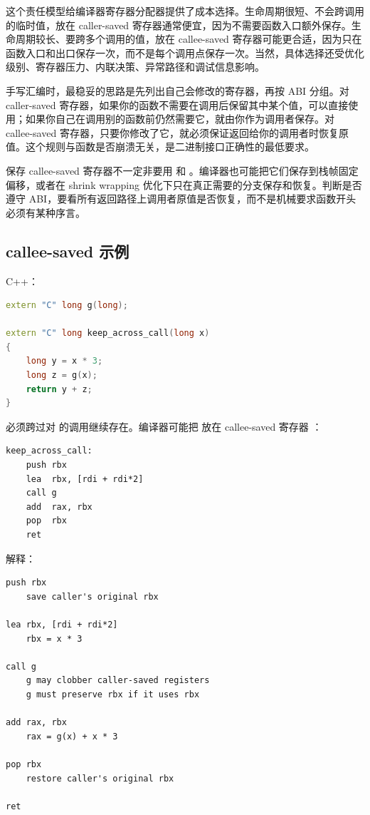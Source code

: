 这个责任模型给编译器寄存器分配器提供了成本选择。生命周期很短、不会跨调用的临时值，放在 caller-saved 寄存器通常便宜，因为不需要函数入口额外保存。生命周期较长、要跨多个调用的值，放在 callee-saved 寄存器可能更合适，因为只在函数入口和出口保存一次，而不是每个调用点保存一次。当然，具体选择还受优化级别、寄存器压力、内联决策、异常路径和调试信息影响。

手写汇编时，最稳妥的思路是先列出自己会修改的寄存器，再按 ABI 分组。对 caller-saved 寄存器，如果你的函数不需要在调用后保留其中某个值，可以直接使用；如果你自己在调用别的函数前仍然需要它，就由你作为调用者保存。对 callee-saved 寄存器，只要你修改了它，就必须保证返回给你的调用者时恢复原值。这个规则与函数是否崩溃无关，是二进制接口正确性的最低要求。

\begin{deepdive}
保存 callee-saved 寄存器不一定非要用  和 。编译器也可能把它们保存到栈帧固定偏移，或者在 shrink wrapping 优化下只在真正需要的分支保存和恢复。判断是否遵守 ABI，要看所有返回路径上调用者原值是否恢复，而不是机械要求函数开头必须有某种序言。
\end{deepdive}

\subsection{callee-saved 示例}

C++：

\begin{lstlisting}[language=C++]
extern "C" long g(long);

extern "C" long keep_across_call(long x)
{
    long y = x * 3;
    long z = g(x);
    return y + z;
}
\end{lstlisting}

 必须跨过对  的调用继续存在。编译器可能把  放在 callee-saved 寄存器 ：

\begin{lstlisting}
keep_across_call:
    push rbx
    lea  rbx, [rdi + rdi*2]
    call g
    add  rax, rbx
    pop  rbx
    ret
\end{lstlisting}

解释：

\begin{lstlisting}
push rbx
    save caller's original rbx

lea rbx, [rdi + rdi*2]
    rbx = x * 3

call g
    g may clobber caller-saved registers
    g must preserve rbx if it uses rbx

add rax, rbx
    rax = g(x) + x * 3

pop rbx
    restore caller's original rbx

ret
\end{lstlisting}

